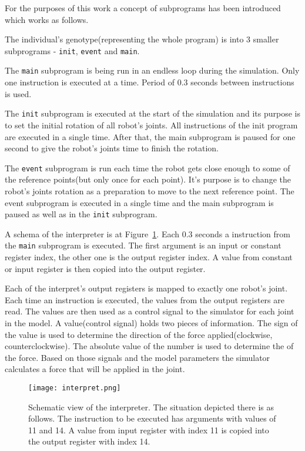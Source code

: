 \documentclass{ExcelAtFIT}
\begin{document}
For the purposes of this work a concept of subprograms has been introduced which works as follows.

The individual's genotype(representing the whole program) is  into 3 smaller subprograms - \texttt{init}, \texttt{event} and \texttt{main}.

The \texttt{main} subprogram is being run in an endless loop during the simulation.
Only one instruction is executed at a time.
Period of 0.3 seconds between instructions is used.

The \texttt{init} subprogram is executed at the start of the simulation and its purpose is to set the initial rotation of all robot's joints.
All instructions of the init program are executed in a single time.
After that, the main subprogram is paused for one second to give the robot's joints time to finish the rotation.

The \texttt{event} subprogram is run each time the robot gets close enough to some of the reference points(but only once for each point).
It's purpose is to change the robot's joints rotation as a preparation to move to the next reference point.
The event subprogram is executed in a single time and the main subprogram is paused as well as in the \texttt{init} subprogram.

A schema of the interpreter is at Figure~\ref{fig:Interpret}.
Each 0.3 seconds a instruction from the \texttt{main} subprogram is executed.
The first argument is an input or constant register index, the other one is the output register index.
A value from constant or input register is then copied into the output register.

Each of the interpret's output registers is mapped to exactly one robot's joint.
Each time an instruction is executed, the values from the output registers are read.
The values are then used as a control signal to the simulator for each joint in the model.
A value(control signal) holds two pieces of information.
The sign of the value is used to determine the direction of the force applied(clockwise, counterclockwise).
The absolute value of the number is used to determine the  of the force.
Based on those signals and the model parameters the simulator calculates a force that will be applied in the joint.


\begin{figure}[t]
	\centering
	{\texttt{[image: interpret.png]}}
	\caption{
	Schematic view of the interpreter.
	The situation depicted there is as follows.
	The instruction to be executed has arguments with values of 11 and 14.
	A value from input register with index 11 is copied into the output register with index 14.
	}
	\label{fig:Interpret}
\end{figure}
\end{document}
